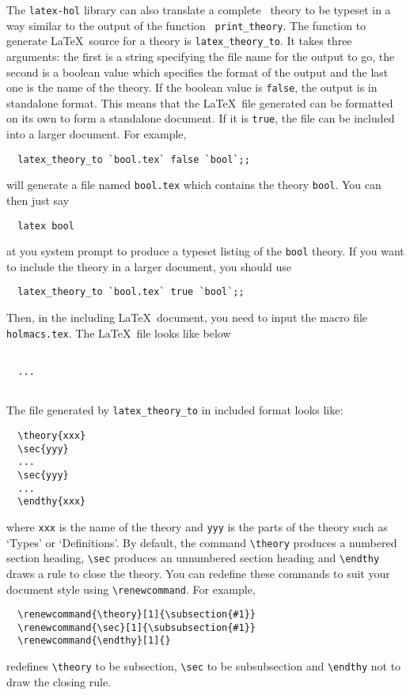 The {\tt latex-hol} library can also translate a complete \HOL\ theory
to be typeset in a way similar to the output of the function {\tt
print\_theory}. The function to generate \LaTeX\ source for a theory
is {\tt latex\_theory\_to}. It takes three arguments: the first is a
string specifying the file name for the output to go, the second is a
boolean value which specifies the format of the output and the last one is
the name of the theory. If the boolean value is {\tt false}, the
output is in standalone format. This means that the \LaTeX\ file
generated can be formatted on its own to form a standalone document.
If it is {\tt true}, the file can be included into a larger document.
For example, 
\begin{verbatim}
  latex_theory_to `bool.tex` false `bool`;;
\end{verbatim}
will generate a file named {\tt bool.tex} which contains the theory
{\tt bool}. You can then just say 
\begin{verbatim}
  latex bool
\end{verbatim}
at you system prompt to produce a typeset listing of the {\tt bool} theory.
If you want to include the theory in a larger document, you should use
\begin{verbatim}
  latex_theory_to `bool.tex` true `bool`;;
\end{verbatim}
Then, in the including \LaTeX\ document, you need to input the macro
file {\tt holmacs.tex}. The \LaTeX\ file looks like below
\begin{verbatim}
  
  ...
  
\end{verbatim}
The file generated by {\tt latex\_theory\_to} in included format looks like:
\begin{verbatim}
  \theory{xxx}
  \sec{yyy}
  ...
  \sec{yyy}
  ...
  \endthy{xxx}
\end{verbatim}
where {\tt xxx} is the name of the theory and {\tt yyy} is the parts
of the theory such as `Types' or `Definitions'. By default, the command
\verb|\theory| produces a numbered section heading, \verb|\sec|
produces an unnumbered section heading and \verb|\endthy| draws a rule
to close the theory. You can redefine these commands to suit your
document style using \verb|\renewcommand|. For example, 
\begin{verbatim}
  \renewcommand{\theory}[1]{\subsection{#1}}
  \renewcommand{\sec}[1]{\subsubsection{#1}}
  \renewcommand{\endthy}[1]{}
\end{verbatim}
 redefines \verb|\theory| to be subsection, \verb|\sec| to be
subsubsection and \verb|\endthy| not to draw the closing rule.

